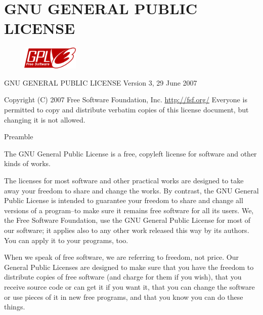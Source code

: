 \newpage
\newcommand{\nocontentsline}[3]{}
\newcommand{\tocless}[2]{\bgroup\let\addcontentsline=\nocontentsline#1{#2}\egroup}
\noHeader

\section[GNU General Public License]{GNU GENERAL PUBLIC LICENSE}
\label{chap:gpl}
\scriptsize
\begin{figure} 
	\vspace{-12pt}
	\includegraphics[width=2.7cm]{gplv3}
	\vspace{-20pt}	
\end{figure}

                    GNU GENERAL PUBLIC LICENSE
                       Version 3, 29 June 2007

 Copyright (C) 2007 Free Software Foundation, Inc. \url{http://fsf.org/}
 Everyone is permitted to copy and distribute verbatim copies
 of this license document, but changing it is not allowed.

Preamble

  The GNU General Public License is a free, copyleft license for
software and other kinds of works.

  The licenses for most software and other practical works are designed
to take away your freedom to share and change the works.  By contrast,
the GNU General Public License is intended to guarantee your freedom to
share and change all versions of a program--to make sure it remains free
software for all its users.  We, the Free Software Foundation, use the
GNU General Public License for most of our software; it applies also to
any other work released this way by its authors.  You can apply it to
your programs, too.

  When we speak of free software, we are referring to freedom, not
price.  Our General Public Licenses are designed to make sure that you
have the freedom to distribute copies of free software (and charge for
them if you wish), that you receive source code or can get it if you
want it, that you can change the software or use pieces of it in new
free programs, and that you know you can do these things.

